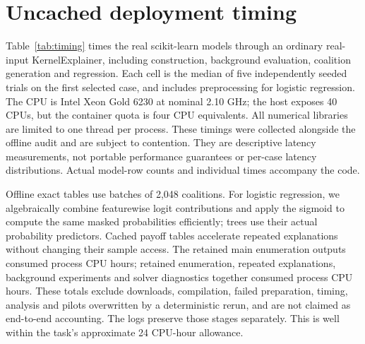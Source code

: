 \section{Uncached deployment timing}
\label{app:timing}
Table~\ref{tab:timing} times the real scikit-learn models through an ordinary real-input KernelExplainer, including construction, background evaluation, coalition generation and regression. Each cell is the median of five independently seeded trials on the first selected case, and includes preprocessing for logistic regression. The CPU is Intel Xeon Gold 6230 at nominal 2.10 GHz; the host exposes 40 CPUs, but the container quota is four CPU equivalents. All numerical libraries are limited to one thread per process. These timings were collected alongside the offline audit and are subject to contention. They are descriptive latency measurements, not portable performance guarantees or per-case latency distributions. Actual model-row counts and individual times accompany the code.

Offline exact tables use batches of 2,048 coalitions. For logistic regression, we algebraically combine featurewise logit contributions and apply the sigmoid to compute the same masked probabilities efficiently; trees use their actual probability predictors. Cached payoff tables accelerate repeated explanations without changing their sample access. The retained main enumeration outputs consumed \GamesCpuHours{} process CPU hours; retained enumeration, repeated explanations, background experiments and solver diagnostics together consumed \TotalCpuHours{} process CPU hours. These totals exclude downloads, compilation, failed preparation, timing, analysis and pilots overwritten by a deterministic rerun, and are not claimed as end-to-end accounting. The logs preserve those stages separately. This is well within the task's approximate 24 CPU-hour allowance.

\begin{table}[t]
\centering\small

\caption{Median milliseconds for one actual online unregularized KernelExplainer run. Five trials per dataset/model/budget, on one selected input. The budget labels are caps; full smaller games may already be exhausted.}
\label{tab:timing}
\end{table}

